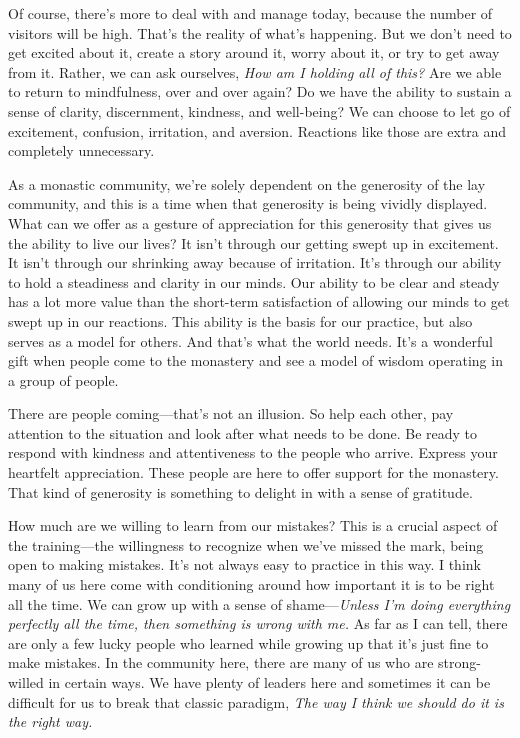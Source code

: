 Of course, there's more to deal with and manage today, because the 
number of visitors will be high. That's the reality of what's 
happening. But we don't need to get excited about it, create a story 
around it, worry about it, or try to get away from it. Rather, we can 
ask ourselves, \emph{How am I holding all of this?} Are we able to 
return to mindfulness, over and over again? Do we have the ability to 
sustain a sense of clarity, discernment, kindness, and well-being? We 
can choose to let go of excitement, confusion, irritation, and 
aversion. Reactions like those are extra and completely unnecessary.

As a monastic community, we're solely dependent on the generosity of 
the lay community, and this is a time when that generosity is being 
vividly displayed. What can we offer as a gesture of appreciation for 
this generosity that gives us the ability to live our lives? It isn't 
through our getting swept up in excitement. It isn't through our 
shrinking away because of irritation. It's through our ability to hold 
a steadiness and clarity in our minds. Our ability to be clear and 
steady has a lot more value than the short-term satisfaction of 
allowing our minds to get swept up in our reactions. This ability is 
the basis for our practice, but also serves as a model for others. And 
that's what the world needs. It's a wonderful gift when people come to 
the monastery and see a model of wisdom operating in a group of people.

There are people coming---that's not an illusion. So help each other, 
pay attention to the situation and look after what needs to be done. Be 
ready to respond with kindness and attentiveness to the people who 
arrive. Express your heartfelt appreciation. These people are here to 
offer support for the monastery. That kind of generosity is something 
to delight in with a sense of gratitude.


How much are we willing to learn from our mistakes? This is a crucial 
aspect of the training---the willingness to recognize when we've missed 
the mark, being open to making mistakes. It's not always easy to 
practice in this way. I think many of us here come with conditioning 
around how important it is to be right all the time. We can grow up 
with a sense of shame---\emph{Unless I'm doing everything perfectly all 
the time, then something is wrong with me.} As far as I can tell, there 
are only a few lucky people who learned while growing up that it's just 
fine to make mistakes. In the community here, there are many of us who 
are strong-willed in certain ways. We have plenty of leaders here and 
sometimes it can be difficult for us to break that classic paradigm, 
\emph{The way I think we should do it is the right way.}

